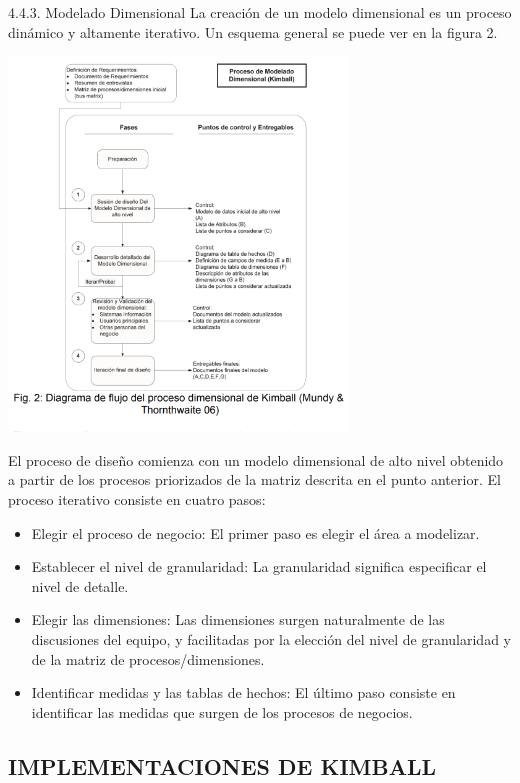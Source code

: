 \documentclass[%
 reprint,
 amsmath,amssymb,
 aps,
]{revtex4-1}
\begin{document}
4.4.3. Modelado Dimensional
La creación de un modelo dimensional es un proceso dinámico y altamente iterativo. Un esquema general se puede ver en la figura 2. 
\begin{center}
	\includegraphics[width=9cm]{./IMAGENES/img04}
\end{center}

El proceso de diseño comienza con un modelo dimensional de alto nivel obtenido a partir de los procesos priorizados de la matriz descrita en el punto anterior.
El proceso iterativo consiste en cuatro pasos:

\begin{itemize}
	\item Elegir el proceso de negocio: El primer paso es elegir el área a modelizar. 
    \item Establecer el nivel de granularidad: La granularidad significa especificar el nivel de detalle.
    \item Elegir las dimensiones: Las dimensiones surgen naturalmente de las discusiones del equipo, y facilitadas por la elección del nivel de granularidad y de la matriz de procesos/dimensiones. 
    \item Identificar medidas y las tablas de hechos: El último paso consiste en identificar las medidas que surgen de los procesos de negocios.
\end{itemize}

\subsection{IMPLEMENTACIONES DE KIMBALL}
\end{document}
